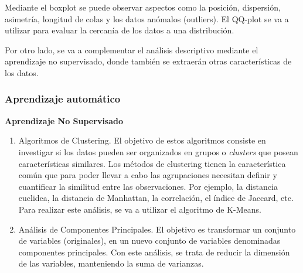 Mediante el boxplot se puede observar aspectos como la posición, dispersión, asimetría, longitud de colas y los datos anómalos (outliers). 
El QQ-plot se va a utilizar para evaluar la cercanía de los datos a una distribución. \cite{Orellana2001}

Por otro lado, se va a complementar el análisis descriptivo mediante el aprendizaje no supervisado, donde también se extraerán otras características de los datos.




\subsubsection{Aprendizaje automático}
\textbf{Aprendizaje No Supervisado}
\begin{enumerate}
\item Algoritmos de Clustering. El objetivo de estos algoritmos consiste en investigar si los datos pueden ser organizados en grupos o \textit{clusters} que posean características similares. %
Los métodos de clustering tienen la característica común que para poder llevar a cabo las agrupaciones necesitan definir y cuantificar la similitud entre las observaciones. Por ejemplo, la distancia euclidea, la distancia de Manhattan, la correlación, el índice de Jaccard, etc. %
Para realizar este análisis, se va a utilizar el algoritmo de K-Means. %
\item Análisis de Componentes Principales. El objetivo es transformar un conjunto de variables (originales), en un nuevo conjunto de variables denominadas componentes principales. Con este análisis, se trata de reducir la dimensión de las variables, manteniendo la suma de varianzas. \cite{santiago2011} %
\end{enumerate}

